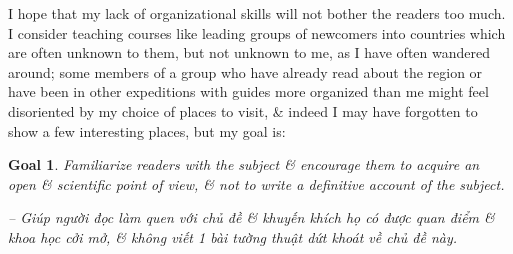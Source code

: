 \documentclass{article}
\newtheorem{goal}{Goal}
\begin{document}
\begin{enumerate}
	I hope that my lack of organizational skills will not bother the readers too much. I consider teaching courses like leading groups of newcomers into countries which are often unknown to them, but not unknown to me, as I have often wandered around; some members of a group who have already read about the region or have been in other expeditions with guides more organized than me might feel disoriented by my choice of places to visit, \& indeed I may have forgotten to show a few interesting places, but my goal is:
	\begin{goal}
		Familiarize readers with the subject \& encourage them to acquire an open \& scientific point of view, \& not to write a definitive account of the subject.
		
		-- Giúp người đọc làm quen với chủ đề \& khuyến khích họ có được quan điểm \& khoa học cởi mở, \& không viết 1 bài tường thuật dứt khoát về chủ đề này.
	\end{goal}

\end{enumerate}
\end{document}
